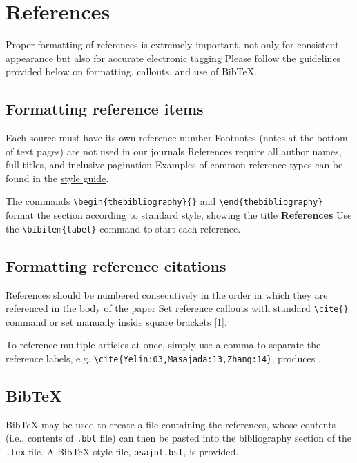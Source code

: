 \documentclass{osa-article}
\begin{document}
\section{References}
\label{sec:refs}
Proper formatting of references is extremely important, not only for consistent appearance but also for accurate electronic tagging
Please follow the guidelines provided below on formatting, callouts, and use of Bib\TeX.

\subsection{Formatting reference items}
Each source must have its own reference number
Footnotes (notes at the bottom of text pages) are not used in our journals
References require all author names, full titles, and inclusive pagination
Examples of common reference types can be found in the  \href{https://www.osapublishing.org/submit/style/osa-styleguide.cfm} {style guide}.


The commands \verb+\begin{thebibliography}{}+ and \verb+\end{thebibliography}+ format the section according to standard style, showing the title {\bfseries References}
Use the \verb+\bibitem{label}+ command to start each reference.

\subsection{Formatting reference citations}
References should be numbered consecutively in the order in which they are referenced in the body of the paper
Set reference callouts with standard \verb+\cite{}+ command or set manually inside square brackets [1].

To reference multiple articles at once, simply use a comma to separate the reference labels, e.g. \verb+\cite{Yelin:03,Masajada:13,Zhang:14}+, produces \cite{Yelin:03,Masajada:13,Zhang:14}.

\subsection{Bib\TeX}
\label{sec:bibtex}
Bib\TeX{} may be used to create a file containing the references, whose contents (i.e., contents of \texttt{.bbl} file) can then be pasted into the bibliography section of the \texttt{.tex} file. A Bib\TeX{} style file, \texttt{osajnl.bst}, is provided.
\end{document}
